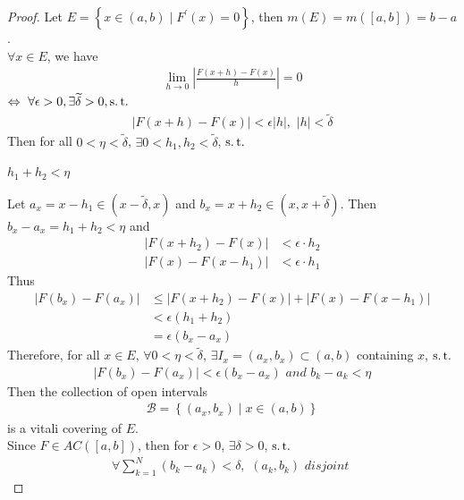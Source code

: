 \begin{thm}
\begin{proof}
			\vspace{1em}
			Let $E = \left\{ x \in (a , b) \mid F^{'}(x) = 0 \right\}$, then $m(E) = m([a , b]) = b - a$. \\
			$\forall x \in E$, we have
			\begin{align}
				\lim_{h \to 0}{\left| \frac{F(x + h) - F(x)}{h} \right|} = 0
			\end{align}
			$\Leftrightarrow \,\, \forall \epsilon > 0 , \exists \widetilde{\delta} > 0 , \operatorname{s.t.}$
			\begin{align}
				\left| F(x + h) - F(x) \right| < \epsilon \left| h \right|  , \,\, \left| h \right| < \widetilde{\delta} 
			\end{align}
			Then for all $0 < \eta < \widetilde{\delta}$, $\exists 0 < h_1 , h_2 < \widetilde{\delta}$, $\operatorname{s.t.}$ 
			\begin{center}
				$h_1 + h_2 < \eta$
			\end{center}
			Let $a_x = x - h_1 \in (x - \widetilde{\delta} , x)$ and $b_x = x + h_2 \in (x , x + \widetilde{\delta})$. Then $b_x - a_x = h_1 + h_2 < \eta$ and
			\begin{align}
				\left| F(x + h_2) - F(x) \right| &< \epsilon \cdot h_2 \\
				\left| F(x) - F(x - h_1) \right| &< \epsilon \cdot h_1
			\end{align}
			Thus
			\begin{align}
				\left| F(b_x) - F(a_x) \right| 
				&\leq \left| F(x + h_2) - F(x) \right| + \left| F(x) - F(x - h_1) \right| \\
				&< \epsilon(h_1 + h_2) \\
				&= \epsilon(b_x - a_x)
			\end{align}
			Therefore, for all $x \in E$, $\forall 0 < \eta < \widetilde{\delta}$, $\exists I_x = (a_x , b_x) \subset (a , b)$ containing $x$, $\operatorname{s.t.}$
			\begin{align}
				\left| F(b_x) - F(a_x) \right| < \epsilon(b_x - a_x) \,\, and \,\, b_k - a_k < \eta
			\end{align}
			Then the collection of open intervals
			\begin{align}
				\mathcal{B} = \left\{ (a_x , b_x) \mid x \in (a , b) \right\}
			\end{align}
			is a vitali covering of $E$. \\
			Since $F \in AC([a , b])$, then for $\epsilon > 0$, $\exists \delta > 0$, $\operatorname{s.t.}$
			\begin{align}
				\forall \sum_{k = 1}^{N}{(b_k - a_k)} < \delta , \,\, (a_k , b_k) \,\, disjoint \,\, 

\end{align}
\end{proof}
\end{thm}
